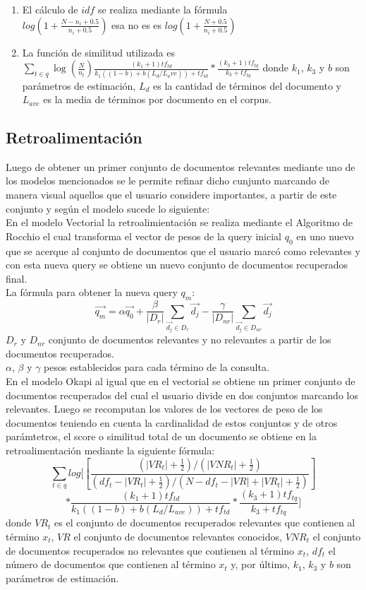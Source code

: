 \documentclass[a4paper,10pt,twocolumn]{article}
\begin{document}
	\begin{enumerate}
		\item El c\'alculo de $idf$ se realiza mediante la f\'ormula \\ $log(1 + \frac{N - n_i + 0.5}{n_i + 0.5})$ esa no es es $log(1 + \frac{N + 0.5}{n_i + 0.5})$
		\item La funci\'on de similitud utilizada es 
		$ \sum_{t\in q} \log (\frac{N}{n_t}) \frac{(k_1 + 1)tf_{td}}{k_1((1-b) + b(L_d/L_ave)) + tf_{td}} * \frac{(k_3 + 1) tf_{tq}}{ k_3 + tf_{tq} } $
		donde $k_1$, $k_3$ y $b$ son par\'ametros de estimaci\'on, $L_d$ es la cantidad de t\'erminos del documento y $L_{ave}$ es la media de t\'erminos por documento 
		en el corpus.
	\end{enumerate}

	\subsection{Retroalimentación}
		Luego de obtener un primer conjunto de documentos relevantes mediante uno de los modelos mencionados se le permite refinar dicho cunjunto marcando de 
		manera visual aquellos que el usuario considere importantes, a partir de este conjunto y según el modelo sucede lo siguiente:\\
		En el modelo Vectorial la retroalimientación se realiza mediante el Algoritmo de Rocchio el cual transforma el vector de pesos de la query inicial $q_0$ 
		en uno nuevo que se acerque al conjunto de documentos que el usuario marcó como relevantes y con esta nueva query se obtiene un nuevo conjunto de documentos 
		recuperados final.\\
		La fórmula para obtener la nueva query $q_m$:
		$$\vec{q_m} = \alpha \vec{q_0} + \frac{\beta}{|D_r|}\sum_{ \vec{d_j} \in D_r} \vec{d_j} - \frac{\gamma}{|D_{nr}|}\sum_{ \vec{d_j} \in D_{nr}} \vec{d_j}   $$
		$D_r$ y $D_{nr}$ conjunto de documentos relevantes y no relevantes a partir de los documentos recuperados.\\
		$\alpha$, $\beta$ y $\gamma$ pesos establecidos para cada término de la consulta.\\
		En el modelo Okapi al igual que en el vectorial se obtiene un primer conjunto de documentos recuperados del cual el usuario divide en dos conjuntos marcando 
		los relevantes. 
		Luego se recomputan los valores de los vectores de peso de los documentos teniendo en cuenta la cardinalidad de estos conjuntos y de otros parámtetros, 
		el score o similitud total de un documento se obtiene en la retroalimentación mediante la siguiente fórmula: \\
		$$\sum_{t \in q} log [[ \frac{(|VR_t| + \frac{1}{2}) / (|VNR_t| + \frac{1}{2})}{(df_t - |VR_t| + \frac{1}{2}) / (N - df_t - |VR| + |VR_t| + \frac{1}{2})}] $$
		$$* \frac{(k_1 + 1) tf_{td}}{k_1((1 - b) + b(L_d / L_{ave})) + tf_{td}} * \frac{(k_3 + 1) tf_{tq}}{k_3 + tf_{tq}}]$$
		donde $VR_t$ es el conjunto de documentos recuperados relevantes que contienen al término $x_t$,
		$VR$ el conjunto de documentos relevantes conocidos, $VNR_t$ el conjunto de documentos recuperados no relevantes que contienen al término $x_t$,
		$df_t$ el número de documentos que contienen al término $x_t$ y, por último, $k_1$, $k_3$ y $b$ son parámetros de estimación.
\end{document}
